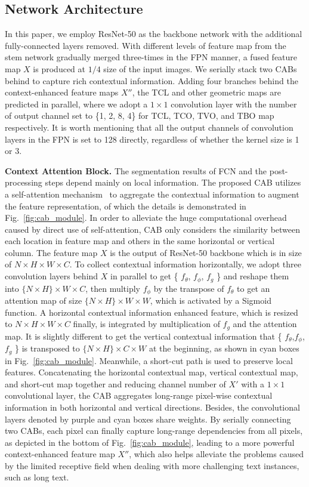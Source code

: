 \documentclass[sigconf]{acmart}
\begin{document}
\subsection{Network Architecture}

In this paper, we employ ResNet-50 as the backbone network with the additional fully-connected layers removed. With different levels of feature map from the stem network gradually merged three-times in the FPN manner, a fused feature map $X$ is produced at $1/4$ size of the input images. We serially stack two CABs behind to capture rich contextual information. Adding four branches behind the context-enhanced feature maps $X''$, the TCL and other geometric maps are predicted in parallel, where we adopt a $1\times 1$ convolution layer with the number of output channel set to \{1, 2, 8, 4\} for TCL, TCO, TVO, and TBO map respectively. It is worth mentioning that all the output channels of convolution layers in the FPN is set to 128 directly, regardless of whether the kernel size is 1 or 3.

\textbf{Context Attention Block.} The segmentation results of FCN and the post-processing steps depend mainly on local information. The proposed CAB utilizes a self-attention mechanism~\cite{vaswani2017attention} to aggregate the contextual information to augment the feature representation, of which the details is demonstrated in Fig.~\ref{fig:cab_module}. 
In order to alleviate the huge computational overhead caused by direct use of self-attention, CAB only considers the similarity between each location in feature map and others in the same horizontal or vertical column.
The feature map  $X$ is the output of ResNet-50 backbone which is in size of $N \times H \times W \times C$. 
To collect contextual information horizontally, we adopt three convolution layers behind $X$ in parallel to get \{ $f_\theta$, $f_\phi$, $f_g$ \} and reshape them into  $\{N \times H\}  \times W  \times C$, then multiply $f_\phi$ by the transpose of $f_\theta$ to get an attention map of size $\{N \times H\} \times W \times W$, which is activated by a Sigmoid function. A horizontal contextual information enhanced feature, which is resized to $N \times H \times W \times C$ finally, is integrated by multiplication of $f_g$ and the attention map. 
It is slightly different to get the vertical contextual information that \{ $f_\theta$,$f_\phi$,$f_g$ \} is transposed to  $\{N \times H\}  \times C  \times W$ at the beginning, as shown in cyan boxes in Fig.~\ref{fig:cab_module}. Meanwhile, a short-cut path is used to preserve local features. Concatenating the horizontal contextual map, vertical contextual map,  and short-cut map together and reducing channel number of $ X' $  with a $1 \times 1$ convolutional layer, the CAB aggregates long-range pixel-wise contextual information in both horizontal and vertical directions. Besides, the convolutional layers denoted by purple and cyan boxes share weights. By serially connecting two CABs, each pixel can finally capture long-range dependencies from all pixels, as depicted in the bottom of Fig.~\ref{fig:cab_module}, leading to a more powerful context-enhanced feature map $X''$, which also helps alleviate the problems caused by the limited receptive field when dealing with more challenging text instances, such as long text.
\end{document}
